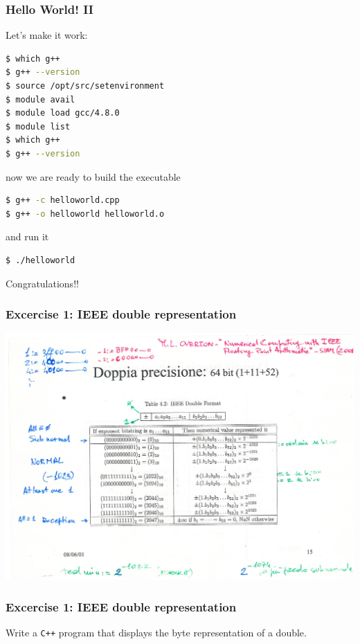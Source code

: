 \documentclass[10pt,c,ignorenonframetext]{beamer}
\begin{document}
\begin{frame}[fragile]
\frametitle{Hello World! II}

Let's make it work:

\begin{lstlisting}[language=bash]
$ which g++
$ g++ --version
$ source /opt/src/setenvironment 
$ module avail
$ module load gcc/4.8.0
$ module list
$ which g++
$ g++ --version
\end{lstlisting}

now we are ready to build the executable

\begin{lstlisting}[language=bash]
$ g++ -c helloworld.cpp
$ g++ -o helloworld helloworld.o
\end{lstlisting}

and run it

\begin{lstlisting}[language=bash]
$ ./helloworld
\end{lstlisting}

Congratulations!!

\end{frame}

\begin{frame}
\frametitle{Excercise 1: IEEE double representation}
\includegraphics[width=.9\linewidth]{IEEE}
\end{frame}

\begin{frame}[fragile]
\frametitle{Excercise 1: IEEE double representation}

Write a {\tt C++} program that displays the byte 
representation of a double.

\end{frame}
\end{document}
